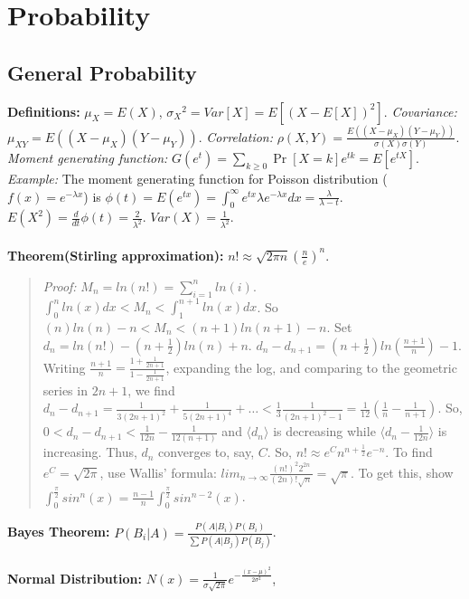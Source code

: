 \section{Probability}
\subsection{General Probability}
{\bf Definitions:}
$\mu_X=E(X)$,
${\sigma_X}^2=Var[X] =  E[(X - E[X])^2]$.
\emph{Covariance:} $\mu_{XY}=E((X-\mu_X)(Y-\mu_Y))$.
\emph{Correlation:} $\rho(X,Y)= {\frac {E((X-\mu_X)(Y-\mu_Y))}
{\sigma(X) \sigma(Y)}}$.
\emph{Moment generating function:}
$G(e^t) = \sum_{k \geq 0} \Pr[X = k] e^{tk} = E[e^{tX}]$.
\emph{Example:} The moment generating function for Poisson distribution 
($f(x)= e^{-\lambda x}$) is
$\phi(t)= E(e^{tx})= \int^{\infty}_0 e^{tx} \lambda e^{- \lambda x} dx=
{\frac {\lambda} {\lambda - t}}$.  
$E(X^2)= {\frac d {dt}} \phi(t) = {\frac 2 {\lambda^2}}$.
$Var(X)= {\frac 1 {\lambda^2}}$.
\\
\\
{\bf Theorem(Stirling approximation):}
$n! \approx {\sqrt {2 \pi n}} ({\frac {n} {e}})^{n}$.
\begin{quote}
\emph{Proof:} $M_n= ln(n!)= \sum_{i=1}^n ln(i)$. 
$\int_0^n ln(x) dx < M_n < \int_1^{n+1} ln(x) dx$. So
$(n) ln(n) - n < M_n < (n+1) ln(n+1) - n$.  
Set $d_n= ln(n!)-(n+{\frac 1 2})ln(n)+n$.
$d_n-d_{n+1}=(n+{\frac 1 2})ln({\frac {n+1} n})-1$.  Writing
${\frac {n+1} n}= {\frac {1+{\frac 1 {2n+1}}} {1-{\frac 1 {2n+1}}}}$,
expanding the log, and comparing to the geometric series in 
$2n+1$, we find $d_n-d_{n+1}= 
{\frac 1 {3(2n+1)^2}} +
{\frac 1 {5(2n+1)^4}} + \ldots < {\frac 1 3} {\frac 1 {(2n+1)^2-1}} = {\frac 1 {12}} 
({\frac 1 n} - {\frac 1 {n+1}})$.  
So, $0 < d_n-d_{n+1} < {\frac 1 {12n}}- {\frac 1 {12(n+1)}} $ and
$\langle d_n \rangle$ is decreasing while
$\langle d_n - {\frac 1 {12n}} \rangle$ is increasing.
Thus, $d_n$ converges to, say, $C$.  So,
$n! \approx e^C n^{n+{\frac 1 2}} e^{-n}$.  To find $e^C = {\sqrt {2 \pi}}$, 
use Wallis' formula:
$lim_{n \rightarrow \infty} {\frac {(n!)^2 2^{2n}} {(2n)! {\sqrt n}}}= {\sqrt {\pi}}$.  
To get this, show
$\int_{0}^{\frac \pi 2} sin^n (x)= {\frac {n-1} n}
\int_{0}^{\frac \pi 2} sin^{n-2} (x)$.
\end{quote}
{\bf Bayes Theorem:} $ P(B_{i}|A)= {\frac {P(A|B_{i})P(B_{i})} {\sum
P(A|B_{j})P(B_{j})}}$.
\\
\\
{\bf Normal Distribution:} $N(x) = {\frac {1} {\sigma {\sqrt {2 \pi }}} }
e^{-{\frac {{(x- \mu)}^{2}} {2 \sigma^{2}}}}$,
